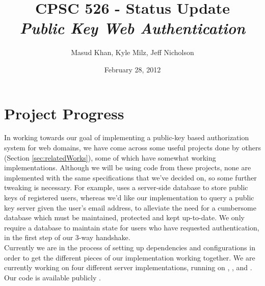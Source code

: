 \documentclass[11pt]{article}
\begin{document}
\title{\bf CPSC 526 - Status Update \\ \emph{Public Key Web Authentication}}
\author{Masud Khan, Kyle Milz, Jeff Nicholson}
\date{February 28, 2012}
\maketitle

\tableofcontents
\pagebreak

\section{Project Progress} \label{sec:progress}
In working towards our goal of implementing a public-key based authorization system for web domains, we have come across some useful projects done by others (Section \ref{sec:relatedWorks}), some of which have somewhat working implementations.  Although we will be using code from these projects, none are implemented with the same specifications that we've decided on, so some further tweaking is necessary.  For example,  uses a server-side database to store public keys of registered users, whereas we'd like our implementation to query a public key server given the user's email address, to alleviate the need for a cumbersome database which must be maintained, protected and kept up-to-date. We only require a database to maintain state for users who have requested authentication, in the first step of our 3-way handshake.\\
Currently we are in the process of setting up dependencies and configurations in order to get the different pieces of our implementation working together.  We are currently working on four different server implementations, running on , ,  and . Our code is available publicly \cite{526proj}.\\
\end{document}
